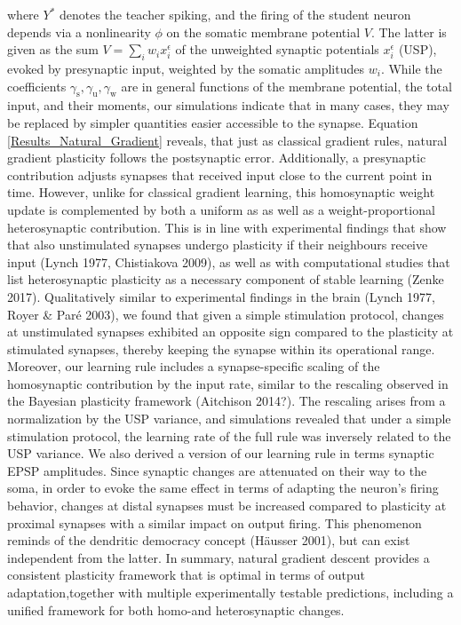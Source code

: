 \documentclass[12pt]{article}
\newcommand{\mrm}{\mathrm}
\begin{document}
where $Y^*$ denotes the teacher spiking, and the firing of the student neuron depends via a nonlinearity $\phi$ on the somatic membrane potential $V$. The latter is given as the sum $V=\sum_i w_i x_i^{\epsilon}$ of the unweighted synaptic potentials $x_i^{\epsilon}$ (USP), evoked by presynaptic input, weighted by the somatic amplitudes $w_i$. While the coefficients $\gamma_{\mrm s},\gamma_{\mrm u},\gamma_{\mrm w}$ are in general functions of the membrane potential, the total input, and their moments, our simulations indicate that in many cases, they may be replaced by simpler quantities easier accessible to the synapse. Equation \ref{Results_Natural_Gradient} reveals, that just as classical gradient rules, natural gradient plasticity follows the postsynaptic error. Additionally, a presynaptic contribution adjusts synapses that received input close to the current point in time. However, unlike for classical gradient learning, this homosynaptic weight update is complemented by both a uniform as as well as a weight-proportional heterosynaptic contribution. This is in line with experimental findings that show that also unstimulated synapses undergo plasticity if their neighbours receive input (Lynch 1977, Chistiakova 2009), as well as with computational studies that list heterosynaptic plasticity as a necessary component of stable learning (Zenke 2017). Qualitatively similar to experimental findings in the brain (Lynch 1977, Royer \& Paré 2003), we found that given a simple stimulation protocol, changes at unstimulated synapses exhibited an opposite sign compared to the plasticity at stimulated synapses, thereby keeping the synapse within its operational range.
Moreover, our learning rule includes a synapse-specific scaling of the homosynaptic contribution by the input rate, similar to the rescaling observed in the Bayesian plasticity framework (Aitchison 2014?). The rescaling arises from a normalization by the USP variance, and simulations revealed that under a simple stimulation protocol, the learning rate of the full rule was inversely related to the USP variance.
We also derived a version of our learning rule in terms synaptic EPSP amplitudes. Since synaptic changes are attenuated on their way to the soma, in order to evoke the same effect in terms of adapting the neuron's firing behavior, changes at distal synapses must be increased compared to plasticity at proximal synapses with a similar impact on output firing. This phenomenon reminds of the dendritic democracy concept (Häusser 2001), but can exist independent from the latter. In summary, natural gradient descent provides a consistent plasticity framework that is optimal in terms of output adaptation,together with multiple experimentally testable predictions, including a unified framework for both homo-and heterosynaptic changes.
\end{document}
